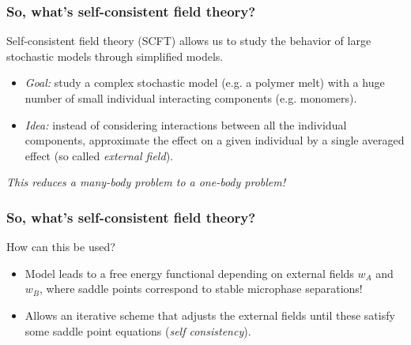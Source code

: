 \begin{frame}[t]
    \frametitle{So, what's self-consistent field theory?}

    Self-consistent field theory (SCFT) allows us to study the behavior of large stochastic models through simplified models.

    \vfill
    \begin{itemize}
        \item {} \emph{Goal:} study a complex stochastic model (e.g. a polymer melt) with a huge number of small individual interacting components (e.g. monomers).
        \item {} \emph{Idea:} instead of considering interactions between all the individual components, approximate the effect on a given individual by a single averaged effect (so called \emph{external field}).
    \end{itemize}

    \vfill
    \centering
    \emph{This reduces a many-body problem to a one-body problem!}
\end{frame}

\begin{frame}[t]
    \frametitle{So, what's self-consistent field theory?}

    How can this be used?


    \begin{itemize}
        \item Model leads to a free energy functional depending on external fields $w_{A}$ and $w_{B}$, where saddle points correspond to stable microphase separations!
        \item {} Allows an iterative scheme that adjusts the external fields until these satisfy some saddle point equations (\emph{self consistency}).
    \end{itemize}
\end{frame}

